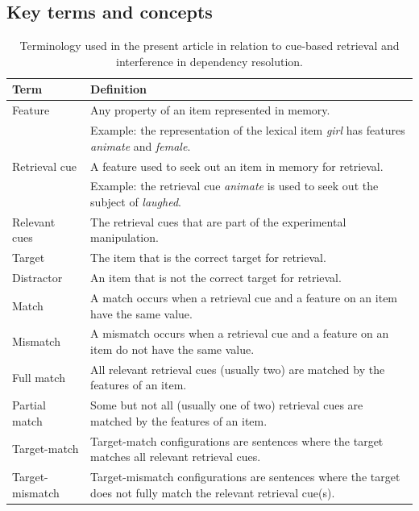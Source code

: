 \documentclass{cambridge7A}\usepackage[]{graphicx}\usepackage[]{color}
\begin{document}
\begin{subappendices}
\section{Key terms and concepts}

\begin{table}[!htbp]
\begin{center}
\caption{Terminology used in the present article in relation to cue-based retrieval and interference in dependency resolution.}\label{tab:definitionsCBR}
{\footnotesize
\begin{tabular}{p{4cm}p{6cm}}
\hline
Term                & Definition \\
\hline
Feature             & Any property of an item represented in memory. \\
                    & Example: the representation of the lexical item \textit{girl} has features \emph{animate} and \emph{female}. \\
Retrieval cue       & A feature used to seek out an item in memory for retrieval. \\
                    & Example: the retrieval cue \textit{animate} is used to seek out the subject of \textit{laughed}. \\
Relevant cues				& The retrieval cues that are part of the experimental manipulation. \\
Target              & The item that is the correct target for retrieval. \\
Distractor          & An item that is not the correct target for retrieval. \\
Match               & A match occurs when a retrieval cue and a feature on an item have the same value. \\
Mismatch            & A mismatch occurs when a retrieval cue and a feature on an item do not have the same value. \\
Full match 			    & All relevant retrieval cues (usually two) are matched by the features of an item. \\
Partial match 			& Some but not all (usually one of two) retrieval cues are matched by the features of an item. \\
Target-match  		  & Target-match configurations are sentences where the target matches all relevant retrieval cues. \\
Target-mismatch 	  & Target-mismatch configurations are sentences where the target does not fully match the relevant retrieval cue(s). \\

\end{tabular}}
\end{center}
\end{table}
\end{subappendices}
\end{document}
